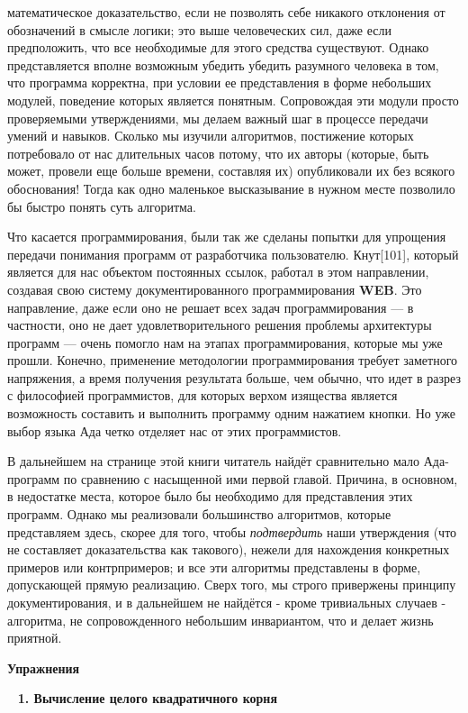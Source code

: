 \noindent математическое доказательство, если не позволять себе никакого отклонения от обозначений в смысле логики; это выше человеческих сил, даже если предположить, что все необходимые для этого средства существуют. Однако представляется вполне возможным убедить убедить разумного человека в том, что программа корректна, при условии ее представления в форме небольших модулей, поведение которых является понятным. Сопровождая эти модули просто проверяемыми утверждениями, мы делаем важный шаг в процессе передачи умений и навыков. Сколько мы изучили алгоритмов, постижение которых потребовало от нас длительных часов потому, что их авторы (которые, быть может, провели еще больше времени, составляя их) опубликовали их без всякого обоснования! Тогда как одно маленькое высказывание в нужном месте позволило бы быстро понять суть алгоритма. 

Что касается программирования, были так же сделаны попытки для упрощения передачи понимания программ от разработчика пользователю. Кнут[101], который является для нас объектом постоянных ссылок, работал в этом направлении, создавая свою систему документированного программирования \textbf{WEB}. Это направление, даже если оно не решает всех задач программирования --- в частности, оно не дает удовлетворительного решения проблемы архитектуры программ --- очень помогло нам на этапах программирования, которые мы уже прошли. Конечно, применение методологии программирования требует заметного напряжения, а время получения результата больше, чем обычно, что идет в разрез с философией программистов, для которых верхом изящества является возможность составить и выполнить программу одним нажатием кнопки. Но уже выбор языка Ада четко отделяет нас от этих программистов.

В дальнейшем на странице этой книги читатель найдёт сравнительно мало Ада-программ по сравнению с насыщенной ими первой главой. Причина, в основном, в недостатке места, которое было бы необходимо для представления этих программ. Однако мы реализовали большинство алгоритмов, которые представляем здесь, скорее для того, чтобы \textit{подтвердить} наши утверждения (что не составляет доказательства как такового), нежели для нахождения конкретных примеров или контрпримеров; и все эти алгоритмы представлены в форме, допускающей прямую реализацию. Сверх того, мы строго привержены принципу документирования, и в дальнейшем не найдётся - кроме тривиальных случаев - алгоритма, не сопровожденного небольшим инвариантом, что и делает жизнь приятной.
\newpage
\cleartop
\begin{center}
\textbf{\Large Упражнения}
\end{center}
\ \newline
\noindent\textbf {1. Вычисление целого квадратичного корня}\ \newline
\\

